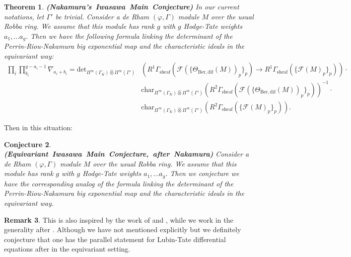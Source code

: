 \documentclass[12pt]{amsart}
\newtheorem{theorem}{Theorem}[section]
\newtheorem{conjecture}[theorem]{Conjecture}
\theoremstyle{definition}
\newtheorem{remark}[theorem]{Remark}
\numberwithin{equation}{section}
\begin{document}
\begin{theorem} \mbox{\bf{(Nakamura's Iwasawa Main Conjecture)}}
In our current notations, let $\Gamma'$ be trivial. Consider a de Rham $(\varphi,\Gamma)$ module $M$ over the usual Robba ring. We assume that this module has rank $g$ with $g$ Hodge-Tate weights	$a_1,...a_g$. Then we have the following formula linking the determinant of the Perrin-Riou-Nakamura big exponential map and the characteristic ideals in the equivariant way:
\begin{align}
\prod_{i}\prod^{g-a_i-1}_{b_i} \nabla_{a_i+b_i} = \mathrm{det}_{\Pi^\infty(\Gamma_K)\widehat{\otimes}\Pi^\infty(\Gamma')}&(R^1\Gamma_\mathrm{sheaf}(\mathcal{F}(\{\Theta_{\mathrm{Ber,dif}}(M))_p\}_p) \rightarrow R^1\Gamma_\mathrm{sheaf}(\{\mathcal{F}(M)_p\}_p))\cdot\\
&\mathrm{char}_{\Pi^\infty(\Gamma_K)\widehat{\otimes}\Pi^\infty(\Gamma')}(R^2\Gamma_\mathrm{sheaf}(\mathcal{F}(\{\Theta_{\mathrm{Ber,dif}}(M))_p\}_p))^{-1}\cdot\\
&\mathrm{char}_{\Pi^\infty(\Gamma_K)\widehat{\otimes}\Pi^\infty(\Gamma')}(R^2\Gamma_\mathrm{sheaf}(\{\mathcal{F}(M)_p\}_p)).	
\end{align}
\end{theorem}









Then in this situation:


\begin{conjecture} \mbox{\bf{(Equivariant Iwasawa Main Conjecture, after Nakamura)}}
Consider a de Rham $(\varphi,\Gamma)$ module $M$ over the usual Robba ring. We assume that this module has rank $g$ with $g$ Hodge-Tate weights	$a_1,...a_g$. Then we conjecture we have the corresponding analog of the formula linking the determinant of the Perrin-Riou-Nakamura big exponential map and the characteristic ideals in the equivariant way.
\end{conjecture}


\begin{remark}
This is also inspired by the work of \cite{LVZ} and \cite{LZ1}, while we work in the generality after \cite{Nakamura1}. Although we have not mentioned explicitly but we definitely conjecture that one has the parallel statement for Lubin-Tate differential equations after \cite{Berger} in the equivariant setting. 	
\end{remark}
\end{document}
